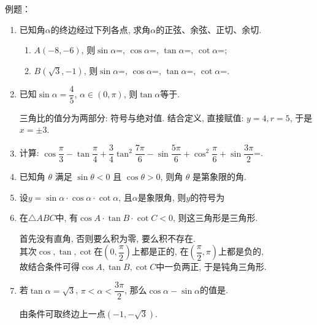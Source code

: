 例题：
\begin{enumerate}
    \item 已知角$\alpha$的终边经过下列各点, 求角$\alpha$的正弦、余弦、正切、余切. 
    \begin{enumerate}[(1)]
    \item $A\left(-8,-6\right)$,     则$\sin\alpha$=, $\cos\alpha$=, $\tan\alpha$=, $\cot\alpha$=; 
    \item $B\left(\sqrt3,-1\right)$, 则$\sin\alpha$=, $\cos\alpha$=, $\tan\alpha$=, $\cot\alpha$=. 
    \end{enumerate}

    \item 已知$\sin\alpha=\dfrac{4}{5}$, $\alpha\in\left(0,\pi\right)$, 则$\tan\alpha$等于. 
    \begin{jieda}
    三角比的值分为两部分: 符号与绝对值. 结合定义, 直接赋值: $y=4,r=5$, 于是$x=\pm3$. 
    \end{jieda}

    \item 计算: $\cos\dfrac{\pi}{3}-\tan\dfrac{\pi}{4}+\dfrac{3}{4}\tan^2\dfrac{7\pi}{6}-\sin\dfrac{5\pi}{6}+\cos^2\dfrac{\pi}{6}+\sin\dfrac{3\pi}{2}$=. 
    
    \item 已知角 $\theta$ 满足 $\sin \theta<0$ 且 $\cos \theta>0$, 则角 $\theta$ 是第象限的角.

    \item 设$y=\sin\alpha\cdot\cos\alpha\cdot\cot\alpha$, 且$\alpha$是象限角, 则$y$的符号为

    \item 在$\triangle{ABC}$中, 有$\cos{A}\cdot\tan{B}\cdot\cot{C}<0$, 则这三角形是三角形.
    \begin{jieda}
    首先没有直角, 否则要么积为零, 要么积不存在. \\
    其次$\cos,\tan,\cot$在$\left(0,\dfrac{\pi}{2}\right)$上都是正的, 在$\left(\dfrac{\pi}{2},\pi\right)$上都是负的, \\
    故结合条件可得$\cos{A},\tan{B},\cot{C}$中一负两正, 于是钝角三角形. 
    \end{jieda}

    \item 若$\tan\alpha=\sqrt3$, $\pi<\alpha<\dfrac{3\pi}{2}$, 那么$\cos\alpha-\sin\alpha$的值是.
    \begin{jieda}
    由条件可取终边上一点$\left(-1,-\sqrt{3}\right)$. 
    \end{jieda}


\end{enumerate}
